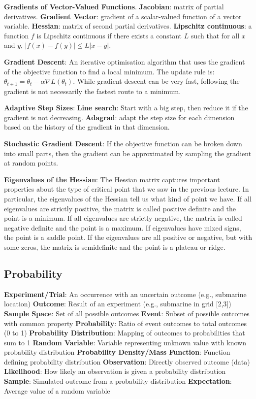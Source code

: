 \documentclass{article}
\begin{document}
\noindent \textbf{Gradients of Vector-Valued Functions}.
\textbf{Jacobian}: matrix of partial derivatives.
\textbf{Gradient Vector}: gradient of a scalar-valued function of a vector variable.
\textbf{Hessian}: matrix of second partial derivatives.
\textbf{Lipschitz continuous}: a function $f$ is Lipschitz continuous if there exists a constant $L$ such that for all $x$ and $y$, $|f(x) - f(y)| \leq L |x - y|$.

\noindent \textbf{Gradient Descent}: An iterative optimisation algorithm that uses the gradient of the objective function to find a local minimum. The update rule is:
$\theta_{t+1} = \theta_t - \alpha \nabla L(\theta_t)$. While gradient descent can be very fast, following the gradient is not necessarily the fastest route to a minimum.

\noindent \textbf{Adaptive Step Sizes}:
\textbf{Line search}: Start with a big step, then reduce it if the gradient is not decreasing.
\textbf{Adagrad}: adapt the step size for each dimension based on the history of the gradient in that dimension.

\noindent \textbf{Stochastic Gradient Descent}: If the objective function can be broken down into
small parts, then the gradient can be approximated by sampling the gradient at random points.

\noindent \textbf{Eigenvalues of the Hessian}: The Hessian matrix captures important properties about the type of critical
point that we saw in the previous lecture. In particular, the eigenvalues of the Hessian tell us what kind of point we have.
If all eigenvalues are strictly positive, the matrix is called positive definite and the point is a minimum. If all eigenvalues
are strictly negative, the matrix is called negative definite and the point is a maximum. If eigenvalues have mixed signs,
the point is a saddle point. If the eigenvalues are all positive or negative, but with some zeros, the matrix is semidefinite
and the point is a plateau or ridge.



\subsection*{Probability}
\textbf{Experiment/Trial}: An occurrence with an uncertain outcome (e.g., submarine location)
\textbf{Outcome}: Result of an experiment (e.g., submarine in grid [2,3])
\textbf{Sample Space}: Set of all possible outcomes
\textbf{Event}: Subset of possible outcomes with common property
\textbf{Probability}: Ratio of event outcomes to total outcomes (0 to 1)
\textbf{Probability Distribution}: Mapping of outcomes to probabilities that sum to 1
\textbf{Random Variable}: Variable representing unknown value with known probability distribution
\textbf{Probability Density/Mass Function}: Function defining probability distribution
\textbf{Observation}: Directly observed outcome (data)
\textbf{Likelihood}: How likely an observation is given a probability distribution
\textbf{Sample}: Simulated outcome from a probability distribution
\textbf{Expectation}: Average value of a random variable
\end{document}
